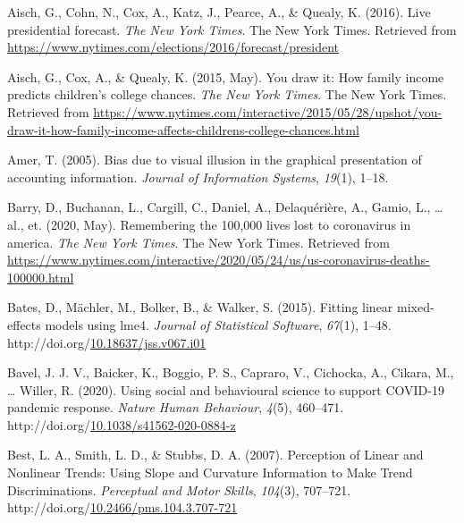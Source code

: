 \documentclass[print]{nuthesis}
\newlength{\cslhangindent}
\newenvironment{CSLReferences}%
{\setlength{\parindent}{0pt}%
\everypar{\setlength{\hangindent}{\cslhangindent}}\ignorespaces}%
{\par}
\begin{document}
\hypertarget{refs}{}
\begin{CSLReferences}{1}{0}
\leavevmode{}%
Aisch, G., Cohn, N., Cox, A., Katz, J., Pearce, A., \& Quealy, K. (2016). Live presidential forecast. \emph{The New York Times}. The New York Times. Retrieved from \url{https://www.nytimes.com/elections/2016/forecast/president}

\leavevmode{}%
Aisch, G., Cox, A., \& Quealy, K. (2015, May). You draw it: How family income predicts children's college chances. \emph{The New York Times}. The New York Times. Retrieved from \url{https://www.nytimes.com/interactive/2015/05/28/upshot/you-draw-it-how-family-income-affects-childrens-college-chances.html}

\leavevmode{}%
Amer, T. (2005). Bias due to visual illusion in the graphical presentation of accounting information. \emph{Journal of Information Systems}, \emph{19}(1), 1--18.

\leavevmode{}%
Barry, D., Buchanan, L., Cargill, C., Daniel, A., Delaquérière, A., Gamio, L., \ldots{} al., et. (2020, May). Remembering the 100,000 lives lost to coronavirus in america. \emph{The New York Times}. The New York Times. Retrieved from \url{https://www.nytimes.com/interactive/2020/05/24/us/us-coronavirus-deaths-100000.html}

\leavevmode{}%
Bates, D., Mächler, M., Bolker, B., \& Walker, S. (2015). Fitting linear mixed-effects models using {lme4}. \emph{Journal of Statistical Software}, \emph{67}(1), 1--48. http://doi.org/\href{https://doi.org/10.18637/jss.v067.i01}{10.18637/jss.v067.i01}

\leavevmode{}%
Bavel, J. J. V., Baicker, K., Boggio, P. S., Capraro, V., Cichocka, A., Cikara, M., \ldots{} Willer, R. (2020). Using social and behavioural science to support {COVID}-19 pandemic response. \emph{Nature Human Behaviour}, \emph{4}(5), 460--471. http://doi.org/\href{https://doi.org/10.1038/s41562-020-0884-z}{10.1038/s41562-020-0884-z}

\leavevmode{}%
Best, L. A., Smith, L. D., \& Stubbs, D. A. (2007). Perception of {Linear} and {Nonlinear} {Trends}: {Using} {Slope} and {Curvature} {Information} to {Make} {Trend} {Discriminations}. \emph{Perceptual and Motor Skills}, \emph{104}(3), 707--721. http://doi.org/\href{https://doi.org/10.2466/pms.104.3.707-721}{10.2466/pms.104.3.707-721}


\end{CSLReferences}
\end{document}
